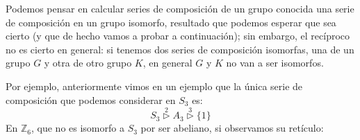 \noindent
Podemos pensar en calcular series de composición de un grupo conocida una serie de composición en un grupo isomorfo, resultado que podemos esperar que sea cierto (y que de hecho vamos a probar a continuación); sin embargo, el recíproco no es cierto en general: si tenemos dos series de composición isomorfas, una de un grupo $G$ y otra de otro grupo $K$, en general $G$ y $K$ no van a ser isomorfos.

\begin{ejemplo}
    Por ejemplo, anteriormente vimos en un ejemplo que la única serie de composición que podemos considerar en $S_3$ es:
    \begin{equation*}
        S_3 \stackrel{2}{\rhd} A_3 \stackrel{3}{\rhd} \{1\}
    \end{equation*}
    En $\mathbb{Z}_6$, que no es isomorfo a $S_3$ por ser abeliano, si observamos su retículo:
            \begin{figure}[H]
                \centering
\end{figure}
\end{ejemplo}
